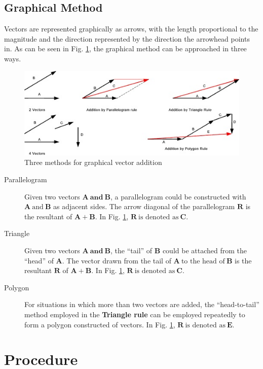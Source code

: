 \documentclass[11pt, titlepage]{article}
\begin{document}
\subsection*{Graphical Method}
Vectors are represented graphically as arrows, with the length proportional to the magnitude and the direction represented by the direction the arrowhead points in. As can be seen in Fig. \ref{fig:1}, the graphical method can be approached in three ways.
\begin{figure}[!ht]
\centering
\includegraphics[scale=1, angle=0]{lab03_graphicvectors.jpg}
\caption{Three methods for graphical vector addition \label{fig:1}}
\end{figure} 
\begin{description}
	\item[Parallelogram] Given two vectors $\mathbf{A ~\text{and} ~B}$, a parallelogram could be constructed with $\mathbf{A} ~\text{and} ~\mathbf{B}$ as adjacent sides. The arrow diagonal of the parallelogram $\mathbf{R}$ is the resultant of $\mathbf{A} + \mathbf{B}$. In Fig. \ref{fig:1}, $\mathbf{R} ~\text{is denoted as} ~\mathbf{C}$.
	\item[Triangle] Given two vectors $\mathbf{A ~\text{and} ~B}$, the ``tail'' of $\mathbf{B}$ could be attached from the ``head'' of $\mathbf{A}$. The vector drawn from the tail of $\mathbf{A} ~\text{to the head of} ~\mathbf{B}$ is the resultant $\mathbf{R}$ of $\mathbf{A} + \mathbf{B}$. In Fig. \ref{fig:1}, $\mathbf{R} ~\text{is denoted as} ~\mathbf{C}$.
	\item[Polygon] For situations in which more than two vectors are added, the ``head-to-tail'' method employed in the \textbf{Triangle rule} can be employed repeatedly to form a polygon constructed of vectors. In Fig. \ref{fig:1}, $\mathbf{R} ~\text{is denoted as} ~\mathbf{E}$.
\end{description}

\section*{Procedure}
\end{document}
